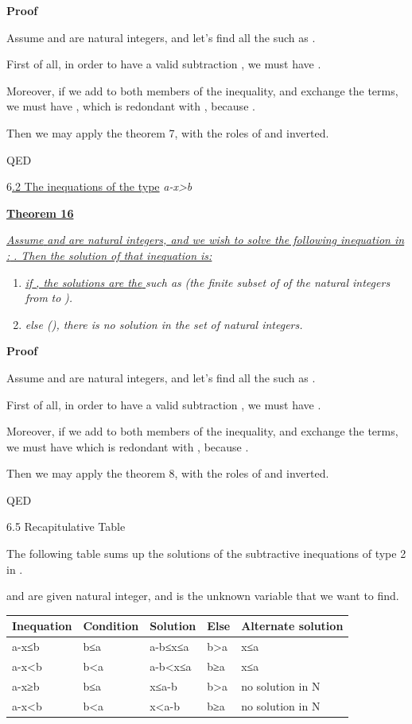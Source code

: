 \documentclass{article}
\providecommand{\tightlist}{%
  \setlength{\itemsep}{0pt}\setlength{\parskip}{0pt}}
\begin{document}
\textbf{Proof}

Assume  and  are natural integers, and let’s find all the  such as .

First of all, in order to have a valid subtraction , we must have .

Moreover, if we add  to both members of the inequality, and exchange the terms, we must have , which is redondant with , because .

Then we may apply the theorem 7, with the roles of  and  inverted.

QED



6\ul{.2 The inequations of the type}\emph{ a-x>b}

\ul{\textbf{Theorem 16}}

\ul{\emph{Assume }}\ul{\emph{ and }}\ul{\emph{ are natural integers, and we wish to solve the following inequation in }}\ul{\emph{: }}\ul{\emph{. Then the solution of that inequation is:}}

\begin{enumerate}
\tightlist
\item \ul{\emph{if }}\ul{\emph{, the solutions are the }}\emph{ such as }\emph{ (the finite subset of }\emph{ of the natural integers from }\emph{ to }\emph{).}
\item \emph{else (}\emph{), there is no solution in the set }\emph{ of natural integers.}
\end{enumerate}

\textbf{Proof}

Assume  and  are natural integers, and let’s find all the  such as .

First of all, in order to have a valid subtraction , we must have .

Moreover, if we add  to both members of the inequality, and exchange the terms, we must have which is redondant with , because .

Then we may apply the theorem 8, with the roles of  and  inverted.

QED

6.5 Recapitulative Table

The following table sums up the solutions of the subtractive inequations of type 2 in .

 and  are given natural integer, and  is the unknown variable that we want to find.

\begin{table}[ht]
\centering
\begin{tabular}{@{}lllll@{}}
\toprule
Inequation & Condition & Solution & Else & Alternate solution \\
\midrule
a-x≤b & b≤a & a-b≤x≤a & b>a & x≤a \\
a-x<b & b<a & a-b<x≤a & b≥a & x≤a \\
a-x≥b & b≤a & x≤a-b & b>a & no solution in N \\
a-x<b & b<a & x<a-b & b≥a & no solution in N \\
\bottomrule
\end{tabular}
\end{table}
\end{document}

